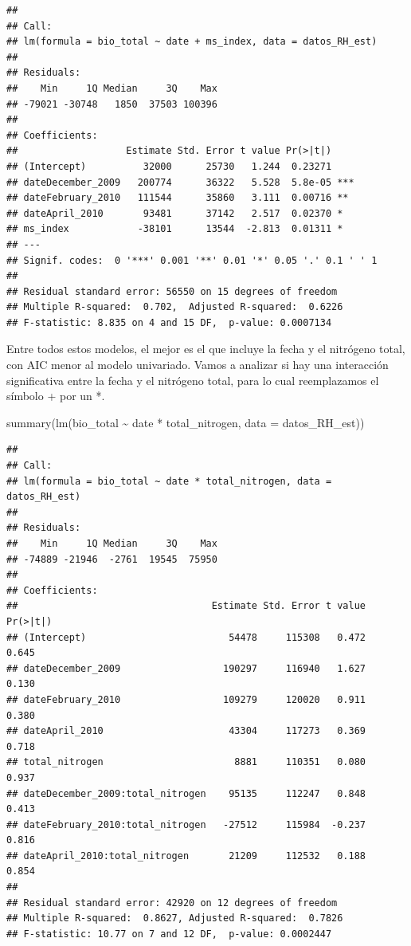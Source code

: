 \documentclass[
]{book}
\newenvironment{Shaded}{\begin{snugshade}}{\end{snugshade}}
\newcommand{\AttributeTok}[1]{\textcolor[rgb]{0.77,0.63,0.00}{#1}}
\newcommand{\FunctionTok}[1]{\textcolor[rgb]{0.00,0.00,0.00}{#1}}
\newcommand{\NormalTok}[1]{#1}
\newcommand{\SpecialCharTok}[1]{\textcolor[rgb]{0.00,0.00,0.00}{#1}}
\begin{document}
\begin{verbatim}
## 
## Call:
## lm(formula = bio_total ~ date + ms_index, data = datos_RH_est)
## 
## Residuals:
##    Min     1Q Median     3Q    Max 
## -79021 -30748   1850  37503 100396 
## 
## Coefficients:
##                   Estimate Std. Error t value Pr(>|t|)    
## (Intercept)          32000      25730   1.244  0.23271    
## dateDecember_2009   200774      36322   5.528  5.8e-05 ***
## dateFebruary_2010   111544      35860   3.111  0.00716 ** 
## dateApril_2010       93481      37142   2.517  0.02370 *  
## ms_index            -38101      13544  -2.813  0.01311 *  
## ---
## Signif. codes:  0 '***' 0.001 '**' 0.01 '*' 0.05 '.' 0.1 ' ' 1
## 
## Residual standard error: 56550 on 15 degrees of freedom
## Multiple R-squared:  0.702,  Adjusted R-squared:  0.6226 
## F-statistic: 8.835 on 4 and 15 DF,  p-value: 0.0007134
\end{verbatim}

Entre todos estos modelos, el mejor es el que incluye la fecha y el nitrógeno total, con AIC menor al modelo univariado. Vamos a analizar si hay una interacción significativa entre la fecha y el nitrógeno total, para lo cual reemplazamos el símbolo + por un *.

\begin{Shaded}
\begin{Highlighting}[]
\FunctionTok{summary}\NormalTok{(}\FunctionTok{lm}\NormalTok{(bio\_total }\SpecialCharTok{\textasciitilde{}}\NormalTok{ date }\SpecialCharTok{*}\NormalTok{ total\_nitrogen, }\AttributeTok{data =}\NormalTok{ datos\_RH\_est))}
\end{Highlighting}
\end{Shaded}

\begin{verbatim}
## 
## Call:
## lm(formula = bio_total ~ date * total_nitrogen, data = datos_RH_est)
## 
## Residuals:
##    Min     1Q Median     3Q    Max 
## -74889 -21946  -2761  19545  75950 
## 
## Coefficients:
##                                  Estimate Std. Error t value Pr(>|t|)
## (Intercept)                         54478     115308   0.472    0.645
## dateDecember_2009                  190297     116940   1.627    0.130
## dateFebruary_2010                  109279     120020   0.911    0.380
## dateApril_2010                      43304     117273   0.369    0.718
## total_nitrogen                       8881     110351   0.080    0.937
## dateDecember_2009:total_nitrogen    95135     112247   0.848    0.413
## dateFebruary_2010:total_nitrogen   -27512     115984  -0.237    0.816
## dateApril_2010:total_nitrogen       21209     112532   0.188    0.854
## 
## Residual standard error: 42920 on 12 degrees of freedom
## Multiple R-squared:  0.8627, Adjusted R-squared:  0.7826 
## F-statistic: 10.77 on 7 and 12 DF,  p-value: 0.0002447
\end{verbatim}
\end{document}
